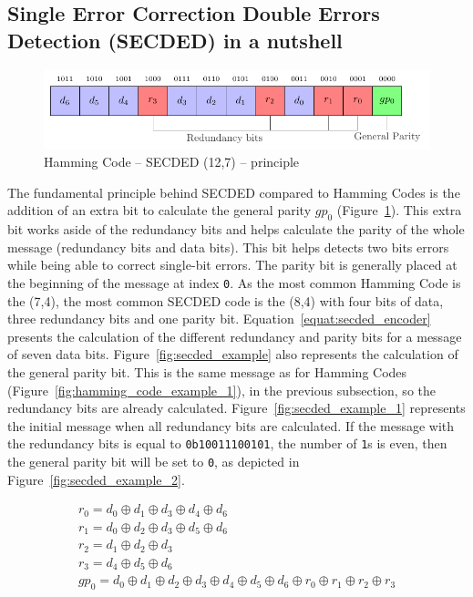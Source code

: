 \subsection{Single Error Correction Double Errors Detection (SECDED) in a nutshell}

\begin{figure}[ht]
    \centering
    \includegraphics[page=1]{c5_countermeasures_dift/img/secded.pdf}
    \caption{Hamming Code -- SECDED (12,7) -- principle}
    \label{fig:secded_functionning}
\end{figure}

The fundamental principle behind SECDED compared to Hamming Codes is the addition of an extra bit to calculate the general parity $gp_0$ (Figure~\ref{fig:secded_functionning}). This extra bit works aside of the redundancy bits and helps calculate the parity of the whole message (redundancy bits and data bits). This bit helps detects two bits errors while being able to correct single-bit errors. The parity bit is generally placed at the beginning of the message at index \texttt{0}. As the most common Hamming Code is the (7,4), the most common SECDED code is the (8,4) with four bits of data, three redundancy bits and one parity bit.
Equation~\ref{equat:secded_encoder} presents the calculation of the different redundancy and parity bits for a message of seven data bits.
Figure~\ref{fig:secded_example} also represents the calculation of the general parity bit. This is the same message as for Hamming Codes (Figure~\ref{fig:hamming_code_example_1}), in the previous subsection, so the redundancy bits are already calculated. Figure~\ref{fig:secded_example_1} represents the initial message when all redundancy bits are calculated. If the message with the redundancy bits is equal to \texttt{0b10011100101}, the number of \texttt{1}s is even, then the general parity bit will be set to \texttt{0}, as depicted in Figure~\ref{fig:secded_example_2}.

\begin{equation} \label{equat:secded_encoder}
    \begin{split}
        r_{0}   = d_{0} \oplus d_{1} \oplus d_{3} \oplus d_{4} \oplus d_{6} \\
        r_{1}   = d_{0} \oplus d_{2} \oplus d_{3} \oplus d_{5} \oplus d_{6} \\
        r_{2}   = d_{1} \oplus d_{2} \oplus d_{3} \\
        r_{3}   = d_{4} \oplus d_{5} \oplus d_{6} \\
        gp_{0}  = d_{0} \oplus d_{1} \oplus d_{2} \oplus d_{3} \oplus d_{4} \oplus d_{5} \oplus d_{6} \oplus r_{0} \oplus r_{1} \oplus r_{2} \oplus r_{3}
    \end{split}
\end{equation}

